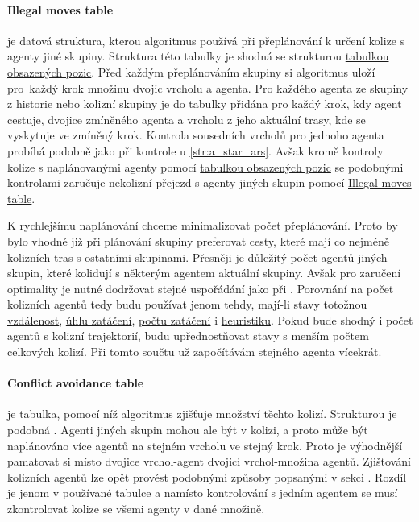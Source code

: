 \paragraph{Illegal moves table}\label{par:varsg_illegal_moves_table} je datová struktura,
kterou algoritmus používá při přeplánování k určení kolize s agenty jiné skupiny.
Struktura této tabulky je shodná se strukturou \hyperref[par:obsazene_pozice]{tabulkou obsazených pozic}.
Před každým přeplánováním skupiny si algoritmus uloží pro~každý krok množinu dvojic vrcholu a agenta.
Pro každého agenta ze skupiny z historie nebo kolizní skupiny je do tabulky přidána pro každý krok, kdy agent cestuje,
dvojice zmíněného agenta a vrcholu z jeho aktuální trasy, kde se vyskytuje ve zmíněný krok.
Kontrola sousedních vrcholů pro jednoho agenta probíhá podobně jako při kontrole u \ref{str:a_star_ars}.
Avšak kromě kontroly kolize s naplánovanými agenty pomocí \hyperref[par:obsazene_pozice]{tabulkou obsazených pozic}
se podobnými kontrolami zaručuje nekolizní přejezd s agenty jiných skupin pomocí
\hyperref[par:varsg_illegal_moves_table]{Illegal moves table}.

K rychlejšímu naplánování chceme minimalizovat počet přeplánování.
Proto by bylo vhodné již při plánování skupiny preferovat cesty,
které mají co nejméně kolizních tras s ostatními skupinami.
Přesněji je důležitý počet agentů jiných skupin, které kolidují s některým agentem aktuální skupiny.
Avšak pro zaručení optimality je nutné dodržovat stejné uspořádání jako při .
Porovnání na počet kolizních agentů tedy budu používat jenom tehdy, mají-li stavy totožnou
\hyperref[par:ars_vzdalenost]{vzdálenost}, \hyperref[par:ars_uhel_zataceni]{úhlu zatáčení},
\hyperref[par:ars_pocet_zataceni]{počtu zatáčení} i \hyperref[par:ars_heuristika]{heuristiku}.
Pokud bude shodný i počet agentů s kolizní trajektorií, budu upřednostňovat stavy s menším počtem celkových kolizí.
Při tomto součtu už započítávám stejného agenta vícekrát.

\paragraph{Conflict avoidance table}\label{par:varsg_conflict_avoidance_table} je tabulka, pomocí níž
algoritmus zjišťuje množství těchto kolizí.
Strukturou je podobná .
Agenti jiných skupin mohou ale být v kolizi, a proto může být naplánováno více agentů na stejném vrcholu ve stejný krok.
Proto je výhodnější pamatovat si místo dvojice vrchol-agent dvojici vrchol-množina agentů.
Zjišťování kolizních agentů lze opět provést podobnými způsoby popsanými v sekci .
Rozdíl je jenom v používané tabulce a namísto kontrolování s jedním agentem
se musí zkontrolovat kolize se všemi agenty v dané množině.

